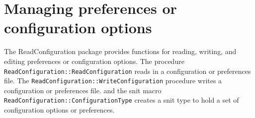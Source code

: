 
\chapter{Managing preferences or configuration options}
\label{chapt:ReadConfiguration}

The ReadConfiguration package provides functions for reading, writing,
and editing preferences or configuration options.  The procedure
\lstinline=ReadConfiguration::ReadConfiguration= reads in a
configuration or preferences file. The
\lstinline=ReadConfiguration::WriteConfiguration= procedure writes a
configuration or preferences file. and the snit macro
\lstinline=ReadConfiguration::ConfigurationType= creates a snit type to
hold a set of configuration options or preferences.

